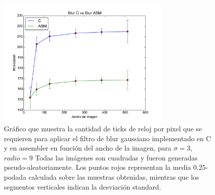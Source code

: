 \begin{figure}
 	\centering
 	\includegraphics[width=0.75\textwidth]{../graficos/blur_v2_lineplot_0.3-1.pdf}
	\caption{\footnotesize Gráfico que muestra la cantidad de ticks de reloj por pixel que se requieren para aplicar el filtro de blur gaussiano implementado en C y en assembler en función del ancho de la imagen, para $\sigma = 3$, $radio = 9$ Todas las imágenes son cuadradas y fueron generadas pseudo-aleatoriamente. Los puntos rojos representan la media 0.25-podada calculada sobre las muestras obtenidas, mientras que los segmentos verticales indican la desviación standard.}
	\label{fig:lineplot.diff}
\end{figure}



